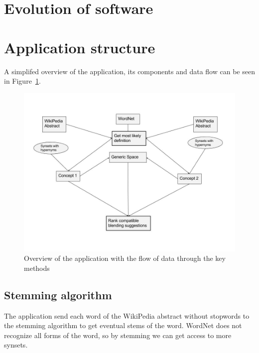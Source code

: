 
\section{Evolution of software}


\section{Application structure}
A simplifed overview of the application, its components and data flow can be seen in Figure~\ref{fig:application-structure}.

\begin{figure}
\centering
\includegraphics[width=1\linewidth]{"Figures/Application structure"}
\caption{Overview of the application with the flow of data through the key methods}
\label{fig:application-structure}
\end{figure}

\subsection{Stemming algorithm}
The application send each word of the WikiPedia abstract without stopwords to the stemming algorithm to get eventual stems of the word. WordNet does not recognize all forms of the word, so by stemming we can get access to more synsets.

